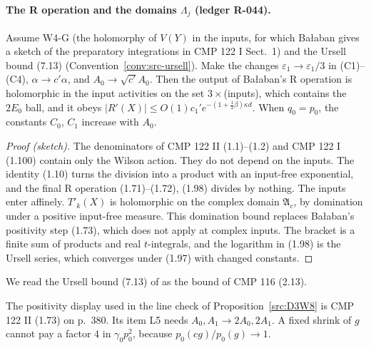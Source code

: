 \paragraph{The R operation and the domains $\Lambda_j$ (ledger R-044).}
\begin{proposition}\label{prop:L037}
Assume W4-G (the holomorphy of $V(Y)$ in the inputs, for which Ba{\l}aban gives a sketch of the preparatory integrations in CMP 122 I Sect.~1) and the Ursell bound (7.13) (Convention~\ref{conv:src-ursell}). Make the changes $\varepsilon_1\to\varepsilon_1/3$ in (C1)--(C4), $\alpha\to c'\alpha$, and $A_0\to\sqrt{c'}A_0$. Then the output of Ba{\l}aban's R operation is holomorphic in the input activities on the set $3\times$(inputs), which contains the $2E_0$ ball, and it obeys $|R'(X)|\le O(1)c_1'e^{-(1+\frac12\beta)\kappa d}$. When $q_0=p_0$, the constants $C_0$, $C_1$ increase with $A_0$.
\end{proposition}
\begin{proof}[Proof (sketch)]
The denominators of CMP 122 II (1.1)--(1.2) and CMP 122 I (1.100) contain only the Wilson action. They do not depend on the inputs. The identity (1.10) turns the division into a product with an input-free exponential, and the final R operation (1.71)--(1.72), (1.98) divides by nothing. The inputs enter affinely. $T'_k(X)$ is holomorphic on the complex domain $\mathfrak A_c$, by domination under a positive input-free measure. This domination bound replaces Ba{\l}aban's positivity step (1.73), which does not apply at complex inputs. The bracket is a finite sum of products and real $t$-integrals, and the logarithm in (1.98) is the Ursell series, which converges under (1.97) with changed constants.
\end{proof}

\begin{convention}\label{conv:src-ursell}
We read the Ursell bound (7.13) of  as the bound of CMP 116 (2.13).
\end{convention}

\begin{remark}
The positivity display used in the line check of Proposition~\ref{src:D3W8} is CMP 122 II (1.73) on p.~380. Its item L5 needs $A_0,A_1\to2A_0,2A_1$. A fixed shrink of $g$ cannot pay a factor 4 in $\gamma_0p_0^2$, because $p_0(cg)/p_0(g)\to1$.
\end{remark}


